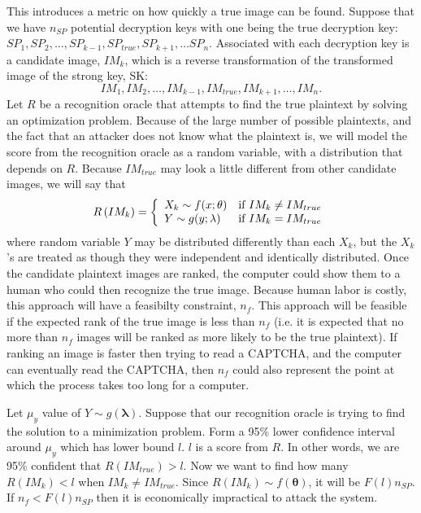 \documentclass[12pt]{article}
\begin{document}
    This introduces a metric on how quickly a true image can be found. Suppose that we have $n_{SP}$ potential decryption keys with one being the true decryption key: 
$SP_1, SP_2, \ldots, SP_{k-1}, SP_{true}, SP_{k+1}, \ldots SP_n$.
Associated with each decryption key is a candidate image, $IM_k$, which is a reverse transformation of the transformed image of the strong key, SK:
$$IM_1, IM_2, \ldots, IM_{k-1}, IM_{true}, IM_{k+1}, \ldots, IM_n.$$
Let $R$ be a recognition oracle that attempts to find the true plaintext by solving an optimization problem. Because of the large number of possible plaintexts, and the fact that an attacker does not know what the plaintext is, we will model the score from the recognition oracle as a random variable, with a distribution that depends on $R$. Because $IM_{true}$ may look a little different from other candidate images, we will say that
 \begin{displaymath}
   R\left(IM_k\right) = \left\{
     \begin{array}{lr}
       X_k \sim f(x; \mathbf{\theta}) & \hbox{if } IM_k \neq IM_{true}\\
       Y \sim g(y; \mathbf{\lambda}) & \hbox{if } IM_k = IM_{true}
     \end{array}
   \right.
\end{displaymath}
where random variable $Y$ may be distributed differently than each $X_k$, but the $X_k$'s are treated as though they were independent and identically distributed.
Once the candidate plaintext images are ranked, the computer could show them to a human who could then recognize the true image. Because human labor is costly, this approach will have a feasibilty constraint, $n_f$. This approach will be feasible if the expected rank of the true image is less than $n_f$ (i.e. it is expected that no more than $n_f$ images will be ranked as more likely to be the true plaintext). If ranking an image is faster then trying to read a CAPTCHA, and the computer can eventually read the CAPTCHA, then $n_f$ could also represent the point at which the process takes too long for a computer.

Let $\mu_y$ value of $Y \sim g(\mathbf{\lambda})$. Suppose that our recognition oracle is trying to find the solution to a minimization problem. Form a 95\% lower confidence interval around $\mu_y$ which has lower bound $l$. $l$ is a score from $R$. In other words, we are 95\% confident that $R\left(IM_{true}\right) > l$. Now we want to find how many $R\left(IM_k\right) < l$ when $IM_k \neq IM_{true}$. Since $R\left(IM_k\right) \sim f(\mathbf{\theta})$, it will be $F(l) n_{SP}$. If $n_f < F(l) n_{SP}$ then it is economically impractical to attack the system.
\end{document}
